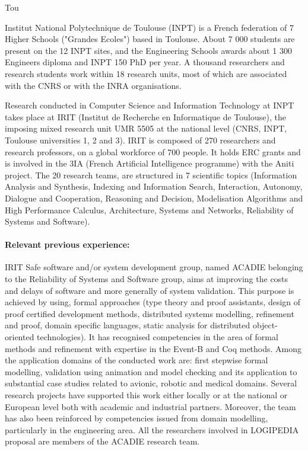 \begin{sitedescription}{Tou}


Institut National Polytechnique de Toulouse (INPT) is a French federation of 7 Higher Schools ("Grandes Ecoles") based in Toulouse. About 7 000 students are present on the 12 INPT sites, and the Engineering Schools awards about 1 300 Engineers diploma and INPT 150 PhD per year. A thousand researchers and research students work within 18 research units, most of which are associated with the CNRS or with the INRA organisations.

Research conducted in Computer Science and Information Technology 
at INPT takes place at IRIT (Institut de Recherche en Informatique de Toulouse), the imposing mixed research unit UMR 5505 at the national level (CNRS, INPT, Toulouse universities 1, 2 and 3). IRIT is composed of 270 researchers and research professors, on a global workforce of 700 people. It holds ERC grants and is involved in the 3IA (French Artificial Intelligence programme) with the Aniti project. 
The 20 research teams, are structured in 7 scientific topics (Information Analysis and Synthesis, Indexing and Information Search, Interaction, Autonomy, Dialogue and Cooperation, Reasoning and Decision, Modelisation  Algorithms and High Performance Calculus,  Architecture, Systems and Networks, Reliability of Systems and Software). 

\paragraph*{Relevant previous experience:} 

 IRIT Safe software and/or system development group, named ACADIE belonging to the Reliability of Systems and Software group,  aims at improving the costs and delays of software and more generally of system validation. This purpose is achieved by using,  formal approaches (type theory and proof assistants, design of proof certified development methods, distributed systems  modelling, refinement  and proof, domain specific languages, static analysis for distributed object-oriented technologies). It has recognised competencies in the area of formal methods and refinement with expertise in the Event-B and Coq methods. Among the application domains of the conducted work are: first stepwise formal modelling, validation using animation and model checking and its application to substantial case studies related to avionic, robotic and medical domains. Several research projects have supported this work either locally or at the national or European level both with academic and industrial partners. Moreover, the team has also been reinforced by competencies issued from domain modelling, particularly in the engineering area.  All the researchers involved in LOGIPEDIA proposal are members of the ACADIE research team.


\end{sitedescription}
